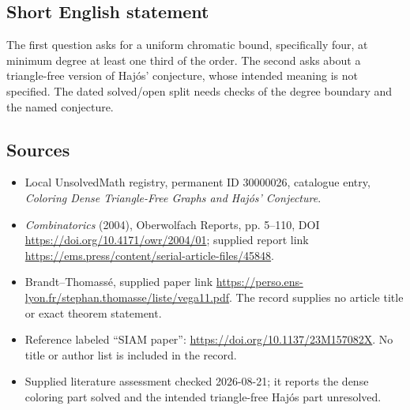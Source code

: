 \documentclass[11pt]{article}
\begin{document}
\subsection{Short English statement}
The first question asks for a uniform chromatic bound, specifically four, at minimum degree at least one third of the order. The second asks about a triangle-free version of Haj\'os' conjecture, whose intended meaning is not specified. The dated solved/open split needs checks of the degree boundary and the named conjecture.
\subsection{Sources}
\begin{itemize}
\item Local UnsolvedMath registry, permanent ID 30000026, catalogue entry, \emph{Coloring Dense Triangle-Free Graphs and Haj\'os' Conjecture}.
\item \emph{Combinatorics} (2004), Oberwolfach Reports, pp. 5--110, DOI \url{https://doi.org/10.4171/owr/2004/01}; supplied report link \url{https://ems.press/content/serial-article-files/45848}.
\item Brandt--Thomass\'e, supplied paper link \url{https://perso.ens-lyon.fr/stephan.thomasse/liste/vega11.pdf}. The record supplies no article title or exact theorem statement.
\item Reference labeled ``SIAM paper'': \url{https://doi.org/10.1137/23M157082X}. No title or author list is included in the record.
\item Supplied literature assessment checked 2026-08-21; it reports the dense coloring part solved and the intended triangle-free Haj\'os part unresolved.
\end{itemize}
\end{document}
